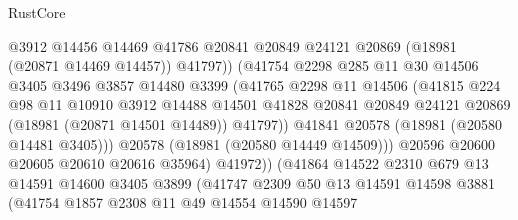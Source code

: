 \begin{lexlean}{RustCore}
\begin{coremodule}
                              @3912
                              @14456
                              @14469
                              @41786
                              @20841
                              @20849
                              @24121
                              @20869
                              (@18981 (@20871 @14469 @14457))
                              @41797))
                          (@41754
                            @2298
                            @285
                            @11
                            @30
                            @14506
                            @3405
                            @3496
                            @3857
                            @14480
                            @3399
                            (@41765
                              @2298
                              @11
                              @14506
                              (@41815
                                @224
                                @98
                                @11
                                @10910
                                @3912
                                @14488
                                @14501
                                @41828
                                @20841
                                @20849
                                @24121
                                @20869
                                (@18981 (@20871 @14501 @14489))
                                @41797))
                            @41841
                            @20578
                            (@18981 (@20580 @14481 @3405)))
                          @20578
                          (@18981 (@20580 @14449 @14509)))
                        @20596
                        @20600
                        @20605
                        @20610
                        @20616
                        @35964)
                      @41972))
                  (@41864
                    @14522
                    @2310
                    @679
                    @13
                    @14591
                    @14600
                    @3405
                    @3899
                    (@41747
                      @2309
                      @50
                      @13
                      @14591
                      @14598
                      @3881
                      (@41754
                        @1857
                        @2308
                        @11
                        @49
                        @14554
                        @14590
                        @14597

\end{coremodule}
\end{lexlean}
